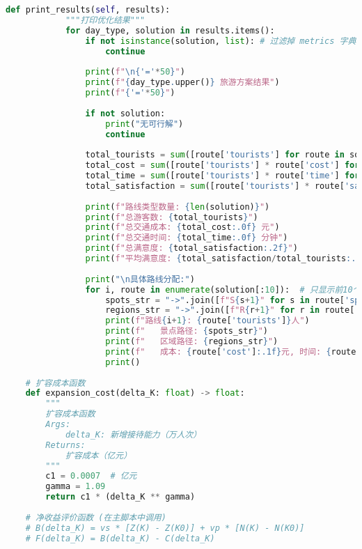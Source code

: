 \begin{lstlisting}[language=Python]
        def print_results(self, results):
            """打印优化结果"""
            for day_type, solution in results.items():
                if not isinstance(solution, list): # 过滤掉 metrics 字典
                    continue
    
                print(f"\n{'='*50}")
                print(f"{day_type.upper()} 旅游方案结果")
                print(f"{'='*50}")
                
                if not solution:
                    print("无可行解")
                    continue
                
                total_tourists = sum([route['tourists'] for route in solution])
                total_cost = sum([route['tourists'] * route['cost'] for route in solution])
                total_time = sum([route['tourists'] * route['time'] for route in solution])
                total_satisfaction = sum([route['tourists'] * route['satisfaction'] for route in solution])
                
                print(f"路线类型数量: {len(solution)}")
                print(f"总游客数: {total_tourists}")
                print(f"总交通成本: {total_cost:.0f} 元")
                print(f"总交通时间: {total_time:.0f} 分钟")
                print(f"总满意度: {total_satisfaction:.2f}")
                print(f"平均满意度: {total_satisfaction/total_tourists:.2f}")
                
                print("\n具体路线分配:")
                for i, route in enumerate(solution[:10]):  # 只显示前10个
                    spots_str = "->".join([f"S{s+1}" for s in route['spots']])
                    regions_str = "->".join([f"R{r+1}" for r in route['regions']])
                    print(f"路线{i+1}: {route['tourists']}人")
                    print(f"   景点路径: {spots_str}")
                    print(f"   区域路径: {regions_str}")
                    print(f"   成本: {route['cost']:.1f}元, 时间: {route['time']:.1f}分钟, 偏好: {route['preference']}")
                    print()
    
    # 扩容成本函数
    def expansion_cost(delta_K: float) -> float:
        """
        扩容成本函数
        Args:
            delta_K: 新增接待能力（万人次）
        Returns:
            扩容成本（亿元）
        """
        c1 = 0.0007  # 亿元
        gamma = 1.09
        return c1 * (delta_K ** gamma)
    
    # 净收益评价函数 (在主脚本中调用)
    # B(delta_K) = vs * [Z(K) - Z(K0)] + vp * [N(K) - N(K0)]
    # F(delta_K) = B(delta_K) - C(delta_K)

\end{lstlisting}

